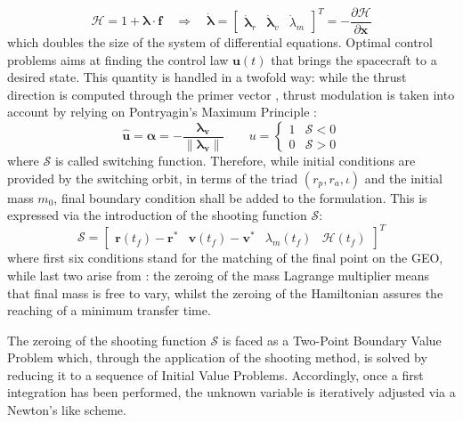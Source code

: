 \begin{equation}
\mathcal{H} = 1 + \boldsymbol{\lambda} \cdot \mathbf{f}
\quad
\Rightarrow
\quad
\dot{\boldsymbol{\lambda}} = \begin{bmatrix}
\dot{\boldsymbol{\lambda}}_r & \dot{\boldsymbol{\lambda}}_v & \dot{\lambda}_m
\end{bmatrix} ^T
= - \frac{\partial \mathcal{H}}{\partial \mathbf{x}}
\end{equation}
which doubles the size of the system of differential equations. Optimal control problems aims at finding the control law $\mathbf{u}(t)$ that brings the spacecraft to a desired state. This quantity is handled in a twofold way: while the thrust direction is computed through the primer vector \cite{lawden}, thrust modulation is taken into account by relying on Pontryagin's Maximum Principle \cite{pontryagin}:
\begin{equation}
\mathbf{\hat{u}} = \boldsymbol{\alpha} = -\frac{\boldsymbol{\lambda_v}}{\parallel\boldsymbol{\lambda_v} \parallel}
\qquad
u =
\begin{cases}
1 & \mathcal{S} < 0 \\
0 & \mathcal{S} > 0 
\end{cases}
\end{equation}
where $\mathcal{S}$ is called switching function. Therefore, while initial conditions are provided by the switching orbit, in terms of the triad $(r_p, r_a, \iota)$ and the initial mass $m_0$, final boundary condition shall be added to the formulation. This is expressed via the introduction of the shooting function $\mathscr{S}$:
\begin{equation}
\mathscr{S} = \begin{bmatrix}
\mathbf{r}(t_f) - \mathbf{r^*} & \mathbf{v}(t_f) - \mathbf{v^*} & \lambda_m (t_f) & \mathcal{H}(t_f)
\end{bmatrix}^T
\end{equation}
where first six conditions stand for the matching of the final point on the GEO, while last two arise from \cite{bryson1975applied}: the zeroing of the mass Lagrange multiplier means that final mass is free to vary, whilst the zeroing of the Hamiltonian assures the reaching of a minimum transfer time.

The zeroing of the shooting function $\mathscr{S}$ is faced as a  Two-Point Boundary Value Problem which, through the application of the shooting method, is solved by reducing it to a sequence of Initial Value Problems. Accordingly, once a first integration has been performed, the unknown variable is iteratively adjusted  via a Newton's like scheme. 

